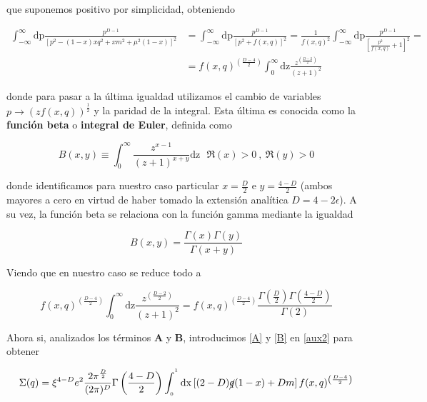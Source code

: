 \documentclass{article}
\numberwithin{equation}{section}
\begin{document}
que suponemos positivo por simplicidad, obteniendo

\begin{equation}\label{key}
\begin{aligned}
\int_{-\infty}^{\infty}\mathrm{dp}\frac{p^{D-1}}{\left[p^{2}-(1-x)xq^{2} + x m^{2} + \mu^{2}(1-x)\right]^{2}} &= \int_{-\infty}^{\infty}\mathrm{dp}\frac{p^{D-1}}{\left[p^{2} + f(x,q)\right]^2}= \frac{1}{f(x,q)^2}\int_{-\infty}^{\infty}\mathrm{dp}\frac{p^{D-1}}{\left[\frac{p^{2}}{f(x,q)} + 1\right]^2} =\\
&= f(x,q)^{\left(\frac{D-4}{2}\right)} \int_0^{\infty}\mathrm{dz}\frac{z^{\left(\frac{D-2}{2}\right)}}{\left(z + 1\right)^2}
\end{aligned}
\end{equation}

donde para pasar a la última igualdad utilizamos el cambio de variables $ p \longrightarrow \left(zf(x,q)\right)^{\frac{1}{2}} $ y la paridad de la integral. Esta última es conocida como la \textbf{función beta} o \textbf{integral de Euler}, definida como

\begin{equation}\label{key}
B(x,y) \equiv \int_0^{\infty} \frac{z^{x-1}}{(z+1)^{x+y}}\mathrm{dz} \ \ \ \Re(x)>0 \ , \ \Re(y)>0
\end{equation}
 
donde identificamos para nuestro caso particular $ x= \frac{D}{2} $ e $ y= \frac{4-D}{2} $ (ambos mayores a cero en virtud de haber tomado la extensión analítica $ D=4-2\epsilon $). A su vez, la función beta se relaciona con la función gamma mediante la igualdad

\begin{equation}\label{key}
B(x,y) = \frac{\Gamma(x) \Gamma(y)}{\Gamma(x+y)}
\end{equation}

Viendo que en nuestro caso se reduce todo a

\begin{equation}\label{B}
f(x,q)^{\left(\frac{D-4}{2}\right)} \int_0^{\infty}\mathrm{dz}\frac{z^{\left(\frac{D-2}{2}\right)}}{\left(z + 1\right)^2} = f(x,q)^{\left(\frac{D-4}{2}\right)} \frac{\Gamma(\frac{D}{2}) \Gamma(\frac{4-D}{2})}{\Gamma(2)}
\end{equation}

Ahora si, analizados los términos $ \textbf{A} $ y $ \textbf{B} $, introducimos \ref{A} y \ref{B} en \ref{aux2} para obtener


\begin{equation}
\Sigma(q)=\xi^{4-D} e^{2}\frac{2\pi^{\frac{D}{2}}}{(2\pi)^{D}} \Gamma\left(\frac{4-D}{2}\right)\int_{_{0}}^{^{1}}\mathrm{dx} \left[(2-D)\cancel{q}(1-x)+Dm \right] f(x,q)^{\left(\frac{D-4}{2}\right)}
\end{equation}
\end{document}
